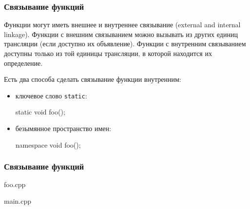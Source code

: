 \documentclass[compress, 8pt, aspectratio=169]{beamer}
\begin{document}
\begin{frame}[fragile]

    \frametitle{Связывание функций}

    Функции могут иметь внешнее и внутреннее связывание (external and internal linkage).
    Функции с внешним связыванием можно вызывать из других единиц трансляции
    (если доступно их объявление).
    Функции с внутренним связыванием доступны только из той единицы трансляции,
    в которой находится их определение.

    \hfill\break
    Есть два способа сделать связывание функции внутренним:

    \begin{itemize}

        \item ключевое слово \verb|static|:
            \begin{myinplacelisting}[minted language=cpp]
static void foo();
            \end{myinplacelisting}

        \item безымянное пространство имен:
            \begin{myinplacelisting}[minted language=cpp]
namespace {
    void foo();
}
            \end{myinplacelisting}

    \end{itemize}

\end{frame}

\begin{frame}[fragile]

    \frametitle{Связывание функций}

    \hfill\break
        {foo.cpp}

        {main.cpp}

\end{frame}
\end{document}
